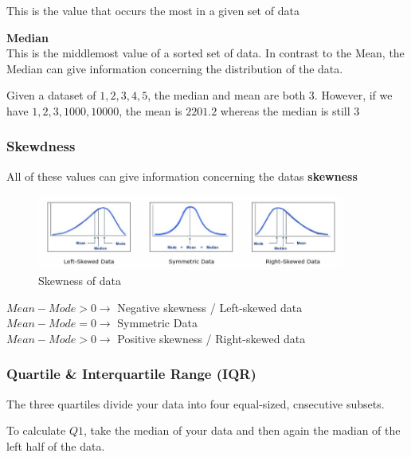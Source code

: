 \documentclass[11pt]{article}
\begin{document}
This is the value that occurs the most in a given set of data

\vspace{10px}

\noindent \textbf{Median} \\

This is the middlemost value of a sorted set of data. In contrast to the Mean, the Median can give information concerning the distribution of the data.

Given a dataset of $1, 2, 3, 4, 5$, the median and mean are both $3$. However, if we have $1, 2, 3, 1000, 10000$, the mean is $2201.2$ whereas the median is still $3$

\newpage

\subsubsection{Skewdness}

All of these values can give information concerning the datas \textbf{skewness}

\begin{figure}[htb!]
    \centering
    \includegraphics[keepaspectratio=true, width=0.9\textwidth]{skewness.png}
    \caption{Skewness of data}
    \label{fig:skewness}
\end{figure}

\noindent
$Mean - Mode > 0 \rightarrow$ Negative skewness / Left-skewed data \\
$Mean - Mode = 0 \rightarrow$ Symmetric Data \\
$Mean - Mode > 0 \rightarrow$ Positive skewness / Right-skewed data

\vspace{10px}

\subsubsection{Quartile \& Interquartile Range (IQR)}

The three quartiles divide your data into four equal-sized, cnsecutive subsets.

To calculate $Q1$, take the median of your data and then again the madian of the left half of the data.
\end{document}
